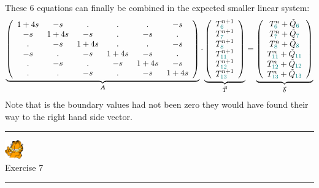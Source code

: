 These 6 equations can finally be combined in the expected smaller linear system:
\begin{equation}
\underbrace{
\left(
\begin{array}{cccccc}
1+4s & -s & . & . & . & -s \\
-s & 1+4s & -s & . & -s & . \\
. & -s & 1+4s & . & . & -s \\ 
-s & . & -s & 1+4s & -s & . \\
. & -s & . & -s & 1+4s & -s \\
. & . & -s & . & -s & 1+4s 
\end{array}
\right)
}_{\bm A}
\cdot
\underbrace{
\left(
\begin{array}{c}
T_{{\color{teal}6}}^{n+1} \\ 
T_{{\color{teal}7}}^{n+1} \\ 
T_{{\color{teal}8}}^{n+1} \\ 
T_{{\color{teal}11}}^{n+1} \\ 
T_{{\color{teal}12}}^{n+1} \\ 
T_{{\color{teal}13}}^{n+1} 
\end{array}
\right)
}_{\vec T}
=
\underbrace{
\left(
\begin{array}{c}
T_{{\color{teal}6}}^n + \tilde{Q}_{\color{teal}6} \\ 
T_{{\color{teal}7}}^n + \tilde{Q}_{\color{teal}7} \\ 
T_{{\color{teal}8}}^n + \tilde{Q}_{\color{teal}8} \\ 
T_{{\color{teal}11}}^n + \tilde{Q}_{\color{teal}11} \\ 
T_{{\color{teal}12}}^n + \tilde{Q}_{\color{teal}12} \\ 
T_{{\color{teal}13}}^n + \tilde{Q}_{\color{teal}13} 
\end{array}
\right)
}_{\vec b}
\end{equation}
Note that is the boundary values had not been zero they would have found their way to the right hand side 
vector.


\begin{center}
\begin{minipage}[t]{0.77\textwidth}
\par\noindent\rule{\textwidth}{0.4pt}
\begin{center}
\includegraphics[width=0.8cm]{images/garftr} \\
{\color{orange}Exercise 7}
\end{center}

\par\noindent\rule{\textwidth}{0.4pt}
\end{minipage}
\end{center}



